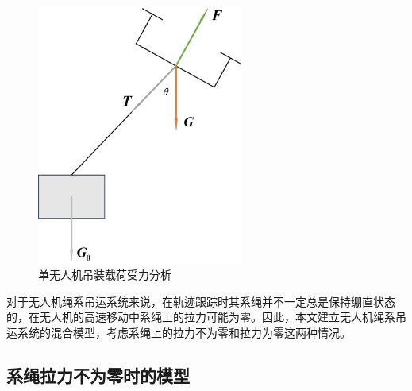 \documentclass[lang=chs, degree=master, blindreview=false, winfonts=true]{yanputhesis}
\begin{document}
\begin{figure}[hbt!]
	\centering
	\includegraphics[width=16pc]{picture/2_2.png} 
	\caption{单无人机吊装载荷受力分析} 
	\label{2_2}
\end{figure}
对于无人机绳系吊运系统来说，在轨迹跟踪时其系绳并不一定总是保持绷直状态的，在无人机的高速移动中系绳上的拉力可能为零。因此，本文建立无人机绳系吊运系统的混合模型，考虑系绳上的拉力不为零和拉力为零这两种情况。

\subsection{系绳拉力不为零时的模型}
\end{document}

